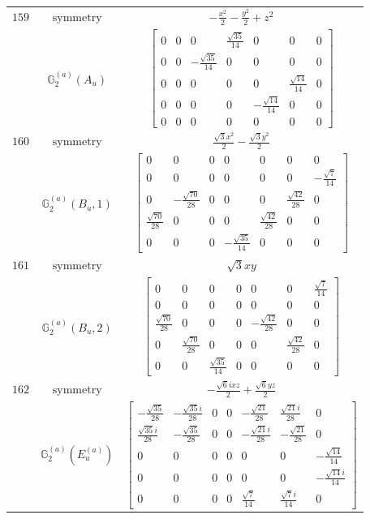 \documentclass[fleqn,8pt,landscape]{jsarticle}
\begin{document}
\begin{longtable}{ccc}
$ 159 $ & $ \text{symmetry} $ & $ - \frac{x^{2}}{2} - \frac{y^{2}}{2} + z^{2} $ \\
$  $ & $ \mathbb{G}_{2}^{(a)}(A_{u}) $ & $ \begin{bmatrix} 0 & 0 & 0 & \frac{\sqrt{35}}{14} & 0 & 0 & 0 \\ 0 & 0 & - \frac{\sqrt{35}}{14} & 0 & 0 & 0 & 0 \\ 0 & 0 & 0 & 0 & 0 & \frac{\sqrt{14}}{14} & 0 \\ 0 & 0 & 0 & 0 & - \frac{\sqrt{14}}{14} & 0 & 0 \\ 0 & 0 & 0 & 0 & 0 & 0 & 0 \end{bmatrix} $ \\ \hline
$ 160 $ & $ \text{symmetry} $ & $ \frac{\sqrt{3} x^{2}}{2} - \frac{\sqrt{3} y^{2}}{2} $ \\
$  $ & $ \mathbb{G}_{2}^{(a)}(B_{u},1) $ & $ \begin{bmatrix} 0 & 0 & 0 & 0 & 0 & 0 & 0 \\ 0 & 0 & 0 & 0 & 0 & 0 & - \frac{\sqrt{7}}{14} \\ 0 & - \frac{\sqrt{70}}{28} & 0 & 0 & 0 & \frac{\sqrt{42}}{28} & 0 \\ \frac{\sqrt{70}}{28} & 0 & 0 & 0 & \frac{\sqrt{42}}{28} & 0 & 0 \\ 0 & 0 & 0 & - \frac{\sqrt{35}}{14} & 0 & 0 & 0 \end{bmatrix} $ \\ \hline
$ 161 $ & $ \text{symmetry} $ & $ \sqrt{3} x y $ \\
$  $ & $ \mathbb{G}_{2}^{(a)}(B_{u},2) $ & $ \begin{bmatrix} 0 & 0 & 0 & 0 & 0 & 0 & \frac{\sqrt{7}}{14} \\ 0 & 0 & 0 & 0 & 0 & 0 & 0 \\ \frac{\sqrt{70}}{28} & 0 & 0 & 0 & - \frac{\sqrt{42}}{28} & 0 & 0 \\ 0 & \frac{\sqrt{70}}{28} & 0 & 0 & 0 & \frac{\sqrt{42}}{28} & 0 \\ 0 & 0 & \frac{\sqrt{35}}{14} & 0 & 0 & 0 & 0 \end{bmatrix} $ \\ \hline
$ 162 $ & $ \text{symmetry} $ & $ - \frac{\sqrt{6} i x z}{2} + \frac{\sqrt{6} y z}{2} $ \\
$  $ & $ \mathbb{G}_{2}^{(a)}(E_{u}^{(a)}) $ & $ \begin{bmatrix} - \frac{\sqrt{35}}{28} & - \frac{\sqrt{35} i}{28} & 0 & 0 & - \frac{\sqrt{21}}{28} & \frac{\sqrt{21} i}{28} & 0 \\ \frac{\sqrt{35} i}{28} & - \frac{\sqrt{35}}{28} & 0 & 0 & - \frac{\sqrt{21} i}{28} & - \frac{\sqrt{21}}{28} & 0 \\ 0 & 0 & 0 & 0 & 0 & 0 & - \frac{\sqrt{14}}{14} \\ 0 & 0 & 0 & 0 & 0 & 0 & - \frac{\sqrt{14} i}{14} \\ 0 & 0 & 0 & 0 & \frac{\sqrt{7}}{14} & \frac{\sqrt{7} i}{14} & 0 \end{bmatrix} $ \\ \hline

\end{longtable}
\end{document}
